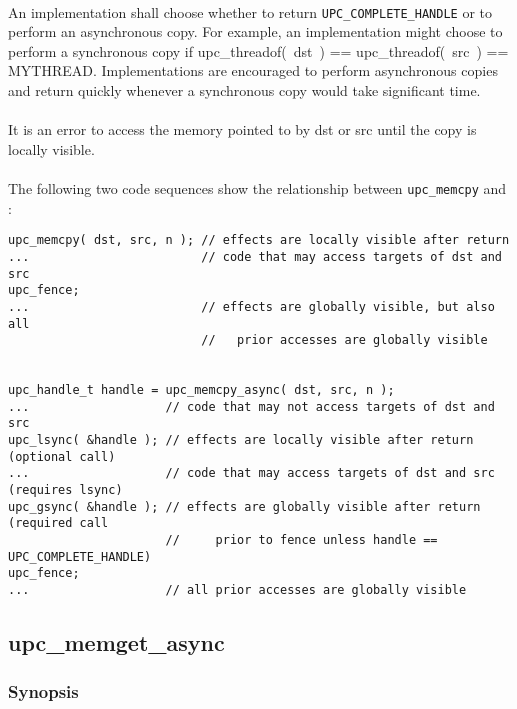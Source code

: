 \documentclass[10pt]{article}
\def \memcpy  {{\tt upc\_memcpy}}
\def \complete {{\tt UPC\_COMPLETE\_HANDLE}}
\begin{document}
\paragraph{} An implementation shall choose whether to return \complete{} or to
perform an asynchronous copy.  For example, an implementation might choose to
perform a synchronous copy if upc\_threadof(~dst~) == upc\_threadof(~src~) ==
MYTHREAD.  Implementations are encouraged to perform asynchronous copies and
return quickly whenever a synchronous copy would take significant time.

\paragraph{} It is an error to access the memory pointed to by dst or src until
the copy is locally visible.

\paragraph{} The following two code sequences show the relationship between
\memcpy{} and \function{}:

\begin{verbatim}
upc_memcpy( dst, src, n ); // effects are locally visible after return
...                        // code that may access targets of dst and src
upc_fence;                 
...                        // effects are globally visible, but also all
                           //   prior accesses are globally visible


upc_handle_t handle = upc_memcpy_async( dst, src, n );
...                   // code that may not access targets of dst and src
upc_lsync( &handle ); // effects are locally visible after return (optional call)
...                   // code that may access targets of dst and src (requires lsync)
upc_gsync( &handle ); // effects are globally visible after return (required call
                      //     prior to fence unless handle == UPC_COMPLETE_HANDLE)
upc_fence;
...                   // all prior accesses are globally visible
\end{verbatim}

\newpage
\subsection{upc\_memget\_async}
\def\function{{\tt upc\_memget\_async}}

\subsubsection{Synopsis}
\end{document}

